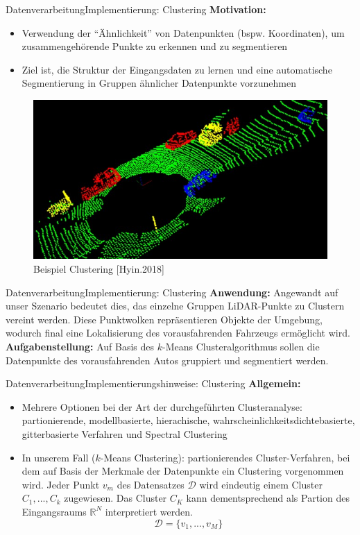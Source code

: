 \documentclass[169, handout	]{THIbeamer} %
\begin{document}
	\begin{frame}{Datenverarbeitung}{Implementierung: Clustering}
		\small
		\textbf{Motivation:}
		\begin{itemize}
			\item Verwendung der \enquote{Ähnlichkeit} von Datenpunkten (bspw. Koordinaten), um zusammengehörende Punkte zu erkennen und zu segmentieren
			\item Ziel ist, die Struktur der Eingangsdaten zu lernen und eine automatische Segmentierung in Gruppen ähnlicher Datenpunkte vorzunehmen
		\end{itemize}
		\begin{figure}
			\includegraphics[scale=0.3]{required/Clustering.jpg}
			\caption{Beispiel Clustering [Hyin.2018]}
        	\label{Clustering}
		\end{figure}
	\end{frame}
	\begin{frame}{Datenverarbeitung}{Implementierung: Clustering}
		\textbf{Anwendung:} Angewandt auf unser Szenario bedeutet dies, das einzelne Gruppen LiDAR-Punkte zu Clustern vereint werden. Diese Punktwolken repräsentieren Objekte der Umgebung, wodurch final eine Lokalisierung des vorausfahrenden Fahrzeugs ermöglicht wird. \\
		\textbf{Aufgabenstellung:} Auf Basis des $k$-Means Clusteralgorithmus sollen die Datenpunkte des vorausfahrenden Autos gruppiert und segmentiert werden.
	\end{frame}		
	\begin{frame}{Datenverarbeitung}{Implementierungshinweise: Clustering}		
		\textbf{Allgemein:}
		\begin{itemize}
			\item Mehrere Optionen bei der Art der durchgeführten Clusteranalyse: partionierende, modellbasierte, hierachische, wahrscheinlichkeitsdichtebasierte, gitterbasierte Verfahren und Spectral Clustering
			\item In unserem Fall ($k$-Means Clustering): partionierendes Cluster-Verfahren, bei dem auf Basis der Merkmale der Datenpunkte ein Clustering vorgenommen wird. Jeder Punkt  $v_m$ des Datensatzes $\mathcal{D}$ wird eindeutig einem Cluster $C_1, ..., C_k$ zugewiesen. Das Cluster $C_K$ kann dementsprechend als Partion des Eingangsraums $\mathbb{R}^N$ interpretiert werden.
			\begin{equation}
				\mathcal{D} = \{v_1, ..., v_M \}
			\end{equation}
	\end{itemize}
	\end{frame}
\end{document}
